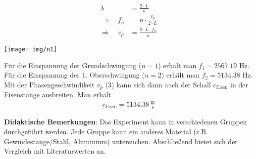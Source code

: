 \documentclass[../main.tex]{subfiles}
\begin{document}
\begin{tcolorbox}
    \vspace{-3.3cm}
    \hspace{-0.7cm}
    \begin{minipage}[]{0.35\textwidth}
        \vspace{-0.5cm}
        \begin{align}
            \lambda &= \frac{2 \cdot L}{n} \\
            \Rightarrow \quad f_n &= n \cdot \frac{v_p}{2\cdot  L}\\[5pt]
            \Rightarrow \quad v_p &= \frac{2\cdot L \cdot f_n}{n}
        \end{align}
    \end{minipage}
    \hspace{0.2cm}
    \begin{minipage}[]{0.6\textwidth}
        \def\svgwidth{220pt}
        
    \end{minipage}

    \vspace{-3.2cm}
    \begin{minipage}[]{0.35\textwidth} 
        \texttt{[image: img/n1]}
    \end{minipage}
    \hspace{0.4cm}
    \begin{minipage}[]{0.6\textwidth}
        Für die Einspannung der Grundschwingung ($n=1$) erhält man $f_1=2567.19$ Hz.\\
        Für die Einspannung der 1. Oberschwingung ($n=2$) erhält man $f_2=5134.38$ Hz.\\
        Mit der Phasengeschwindikeit $v_p$ (3) kann sich dann auch der Schall $c_{\text{Eisen}}$ in der Eisenstange ausbreiten. Man erhält
        \begin{align*}
            c_{\text{Eisen}} = 5134.38 \, \frac{\text{m}}{\text{s}} 
        \end{align*}
    
        \vspace{0.4cm}
    \textbf{Didaktische Bemerkungen}: Das Experiment kann in verschiedenen Gruppen durchgeführt werden. Jede Gruppe kann ein anderes Material (z.B. Gewindestange/Stahl, Aluminium) untersuchen. Abschließend bietet sich der Vergleich mit Literaturwerten an. 
    \end{minipage}

\end{tcolorbox}
\end{document}

